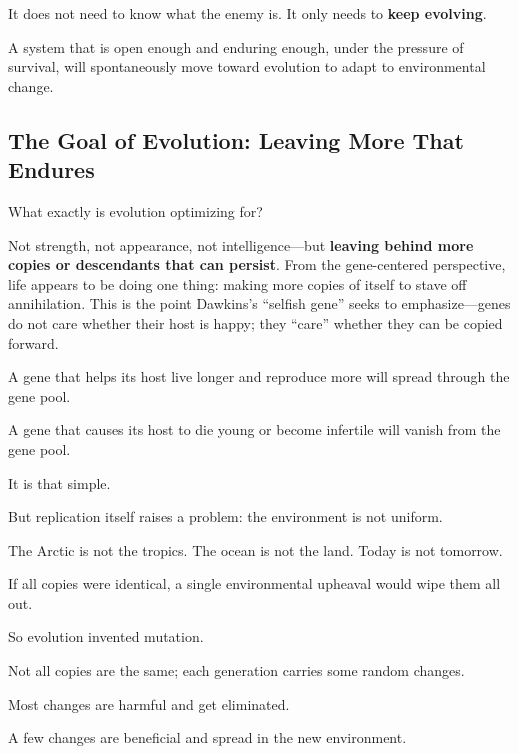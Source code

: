 It does not need to know what the enemy is. It only needs to \textbf{keep evolving}.

\begin{importantbox}
A system that is open enough and enduring enough, under the pressure of survival, will spontaneously move toward evolution to adapt to environmental change.
\end{importantbox}

\newpage
\subsection{The Goal of Evolution: Leaving More That Endures}

What exactly is evolution optimizing for?

Not strength, not appearance, not intelligence---but \textbf{leaving behind more copies or descendants that can persist}.
From the gene-centered perspective, life appears to be doing one thing: making more copies of itself to stave off annihilation. This is the point Dawkins's ``selfish gene'' seeks to emphasize---genes do not care whether their host is happy; they ``care'' whether they can be copied forward.

\vspace{1em}

A gene that helps its host live longer and reproduce more will spread through the gene pool.

A gene that causes its host to die young or become infertile will vanish from the gene pool.

It is that simple.

\vspace{1em}

But replication itself raises a problem: the environment is not uniform.

The Arctic is not the tropics. The ocean is not the land. Today is not tomorrow.

If all copies were identical, a single environmental upheaval would wipe them all out.

\vspace{1em}

So evolution invented mutation.

Not all copies are the same; each generation carries some random changes.

Most changes are harmful and get eliminated.

A few changes are beneficial and spread in the new environment.

